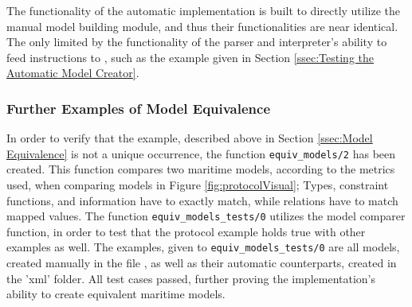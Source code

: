 The functionality of the automatic implementation is built to directly utilize the manual model building module, and thus their functionalities are near identical. The only limited by the functionality of the parser and interpreter's ability to feed instructions to , such as the example given in Section \ref{ssec:Testing the Automatic Model Creator}.

\subsubsection{Further Examples of Model Equivalence}

In order to verify that the example, described above in Section \ref{ssec:Model Equivalence} is not a unique occurrence, the function \lstinline{equiv_models/2} has been created. This function compares two maritime models, according to the metrics used, when comparing models in Figure \ref{fig:protocolVisual}; Types, constraint functions, and information have to exactly match, while relations have to match mapped values. The function \lstinline{equiv_models_tests/0} utilizes the model comparer function, in order to test that the protocol example holds true with other examples as well. The examples, given to \lstinline{equiv_models_tests/0} are all models, created manually in the file , as well as their automatic counterparts, created in the 'xml' folder. All test cases passed, further proving the implementation's ability to create equivalent maritime models.
